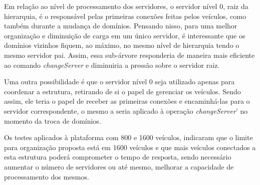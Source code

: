 \documentclass[
	12pt,				%
	oneside,			%
	a4paper,			%
	english,			%
	brazil				%
	]{abntex2ppgsi}
\begin{document}
Em relação ao nível de processamento dos servidores, o servidor nível 0, raiz da hierarquia, é o responsável pelas primeiras conexões feitas pelos veículos, como também durante a mudança de domínios. Pensando nisso, para uma melhor organização e diminuição de carga em um único servidor, é interessante que os domínios vizinhos fiquem, ao máximo, no mesmo nível de hierarquia tendo o mesmo servidor pai. Assim, essa sub-árvore responderia de maneira mais eficiente ao comando \textit{changeServer} e diminuiria a pressão sobre o servidor raiz.

Uma outra possibilidade é que o servidor nível 0 seja utilizado apenas para coordenar a estrutura, retirando de si o papel de gerenciar os veículos. Sendo assim, ele teria o papel de receber as primeiras conexões  e encaminhá-las para o servidor correspondente, o mesmo a seria aplicado à operação \textit{changeServer}' no momento da troca de domínios.

Os testes aplicados à plataforma com 800 e 1600 veículos, indicaram que o limite para organização proposta está em 1600 veículos e que mais veículos conectados a esta estrutura poderá comprometer o tempo de resposta, sendo necessário aumentar o número de servidores ou até mesmo, melhorar a capacidade de processamento dos mesmos. 




\end{document}
